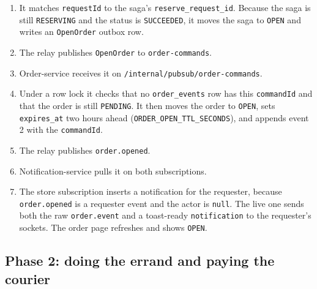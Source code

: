 \documentclass[11pt,a4paper]{article}
\newcommand{\code}[1]{\nolinkurl{#1}}
\begin{document}
\begin{enumerate}
  \item It matches \code{requestId} to the saga's \code{reserve_request_id}. Because
  the saga is still \code{RESERVING} and the status is \code{SUCCEEDED}, it moves the
  saga to \code{OPEN} and writes an \code{OpenOrder} outbox row.
  \item The relay publishes \code{OpenOrder} to \code{order-commands}.
  \item Order-service receives it on \code{/internal/pubsub/order-commands}.
  \item Under a row lock it checks that no \code{order_events} row has this
  \code{commandId} and that the order is still \code{PENDING}. It then moves the order to
  \code{OPEN}, sets \code{expires_at} two hours ahead (\code{ORDER_OPEN_TTL_SECONDS}), and
  appends event 2 with the \code{commandId}.
  \item The relay publishes \code{order.opened}.
  \item Notification-service pulls it on both subscriptions.
  \item The store subscription inserts a notification for the requester, because
  \code{order.opened} is a requester event and the actor is \code{null}. The live one
  sends both the raw \code{order.event} and a toast-ready \code{notification} to the
  requester's sockets. The order page refreshes and shows \code{OPEN}.
\end{enumerate}

\subsection{Phase 2: doing the errand and paying the courier}
\end{document}
